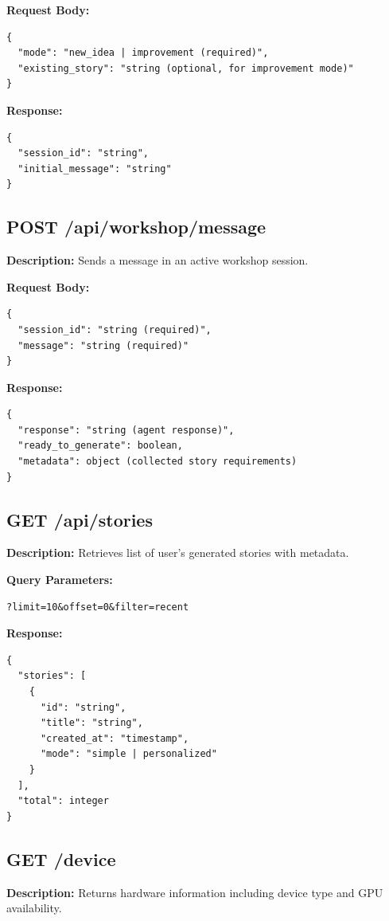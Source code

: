 \textbf{Request Body:}
\begin{verbatim}
{
  "mode": "new_idea | improvement (required)",
  "existing_story": "string (optional, for improvement mode)"
}
\end{verbatim}

\textbf{Response:}
\begin{verbatim}
{
  "session_id": "string",
  "initial_message": "string"
}
\end{verbatim}

\subsection{POST /api/workshop/message}

\textbf{Description:} Sends a message in an active workshop session.

\textbf{Request Body:}
\begin{verbatim}
{
  "session_id": "string (required)",
  "message": "string (required)"
}
\end{verbatim}

\textbf{Response:}
\begin{verbatim}
{
  "response": "string (agent response)",
  "ready_to_generate": boolean,
  "metadata": object (collected story requirements)
}
\end{verbatim}

\subsection{GET /api/stories}

\textbf{Description:} Retrieves list of user's generated stories with metadata.

\textbf{Query Parameters:}
\begin{verbatim}
?limit=10&offset=0&filter=recent
\end{verbatim}

\textbf{Response:}
\begin{verbatim}
{
  "stories": [
    {
      "id": "string",
      "title": "string",
      "created_at": "timestamp",
      "mode": "simple | personalized"
    }
  ],
  "total": integer
}
\end{verbatim}

\subsection{GET /device}

\textbf{Description:} Returns hardware information including device type and GPU availability.

